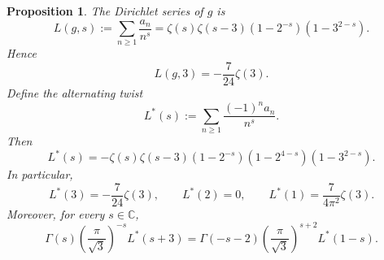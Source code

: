 \documentclass[11pt]{amsart}
\newtheorem{proposition}[theorem]{Proposition}
\theoremstyle{definition}
\theoremstyle{remark}
\newcommand{\C}{\mathbb{C}}
\begin{document}
\begin{proposition}\label{prop:Lfunctions}
The Dirichlet series of $g$ is
\begin{equation}\label{eq:Lg-factor}
L(g,s):=\sum_{n\ge 1}\frac{a_n}{n^s}=\zeta(s)\zeta(s-3)(1-2^{-s})(1-3^{2-s}).
\end{equation}
Hence
\begin{equation}\label{eq:Lg3}
L(g,3)=-\frac{7}{24}\zeta(3).
\end{equation}
Define the alternating twist
\begin{equation}\label{eq:Lstar-def}
L^*(s):=\sum_{n\ge 1}\frac{(-1)^n a_n}{n^s}.
\end{equation}
Then
\begin{equation}\label{eq:Lstar-factor}
L^*(s)=-\zeta(s)\zeta(s-3)(1-2^{-s})(1-2^{4-s})(1-3^{2-s}).
\end{equation}
In particular,
\begin{equation}\label{eq:Lstar-specials}
L^*(3)=-\frac{7}{24}\zeta(3),
\qquad
L^*(2)=0,
\qquad
L^*(1)=\frac{7}{4\pi^2}\zeta(3).
\end{equation}
Moreover, for every $s\in\C$,
\begin{equation}\label{eq:Lstar-fe}
\Gamma(s)\left(\frac{\pi}{\sqrt 3}\right)^{-s}L^*(s+3)
=
\Gamma(-s-2)\left(\frac{\pi}{\sqrt 3}\right)^{s+2}L^*(1-s).
\end{equation}
\end{proposition}
\end{document}
